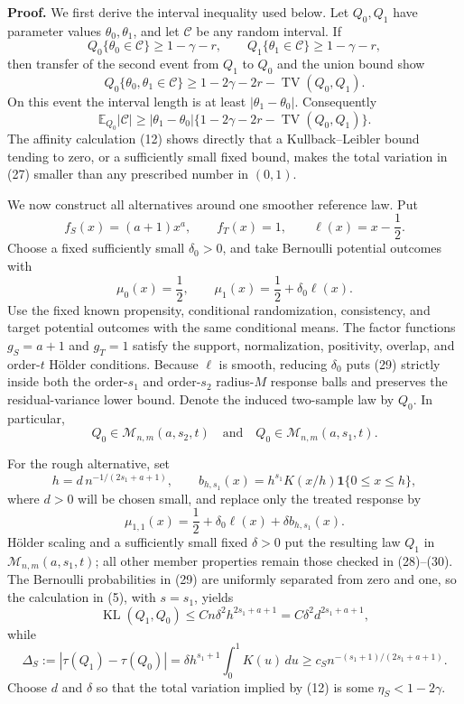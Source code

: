 \textbf{Proof.}
We first derive the interval inequality used below.  Let \(Q_0,Q_1\) have parameter values \(\theta_0,\theta_1\), and let \(\mathcal C\) be any random interval.  If
\[
Q_0\{\theta_0\in\mathcal C\}\ge1-\gamma-r,
\qquad
Q_1\{\theta_1\in\mathcal C\}\ge1-\gamma-r,
\tag{25}
\]
then transfer of the second event from \(Q_1\) to \(Q_0\) and the union bound show
\[
Q_0\{\theta_0,\theta_1\in\mathcal C\}
\ge1-2\gamma-2r-\operatorname{TV}(Q_0,Q_1).
\tag{26}
\]
On this event the interval length is at least \(|\theta_1-\theta_0|\).  Consequently
\[
\mathbb E_{Q_0}|\mathcal C|
\ge |\theta_1-\theta_0|
 \{1-2\gamma-2r-\operatorname{TV}(Q_0,Q_1)\}.
\tag{27}
\]
The affinity calculation (12) shows directly that a Kullback--Leibler bound tending to zero, or a sufficiently small fixed bound, makes the total variation in (27) smaller than any prescribed number in \((0,1)\).

We now construct all alternatives around one smoother reference law.  Put
\[
f_S(x)=(a+1)x^a,
\qquad
f_T(x)=1,
\qquad
\ell(x)=x-\frac12.
\tag{28}
\]
Choose a fixed sufficiently small \(\delta_0>0\), and take Bernoulli potential outcomes with
\[
\mu_0(x)=\frac12,
\qquad
\mu_1(x)=\frac12+\delta_0\ell(x).
\tag{29}
\]
Use the fixed known propensity, conditional randomization, consistency, and target potential outcomes with the same conditional means.  The factor functions \(g_S=a+1\) and \(g_T=1\) satisfy the support, normalization, positivity, overlap, and order-\(t\) Hölder conditions.  Because \(\ell\) is smooth, reducing \(\delta_0\) puts (29) strictly inside both the order-\(s_1\) and order-\(s_2\) radius-\(M\) response balls and preserves the residual-variance lower bound.  Denote the induced two-sample law by \(Q_0\).  In particular,
\[
Q_0\in\mathcal M_{n,m}(a,s_2,t)
\quad\text{and}\quad
Q_0\in\mathcal M_{n,m}(a,s_1,t).
\tag{30}
\]

For the rough alternative, set
\[
h=d\,n^{-1/(2s_1+a+1)},
\qquad
b_{h,s_1}(x)=h^{s_1}K(x/h)\mathbf 1\{0\le x\le h\},
\tag{31}
\]
where \(d>0\) will be chosen small, and replace only the treated response by
\[
\mu_{1,1}(x)=\frac12+\delta_0\ell(x)+\delta b_{h,s_1}(x).
\tag{32}
\]
Hölder scaling and a sufficiently small fixed \(\delta>0\) put the resulting law \(Q_1\) in \(\mathcal M_{n,m}(a,s_1,t)\); all other member properties remain those checked in (28)--(30).  The Bernoulli probabilities in (29) are uniformly separated from zero and one, so the calculation in (5), with \(s=s_1\), yields
\[
\operatorname{KL}(Q_1,Q_0)
\le Cn\delta^2h^{2s_1+a+1}
=C\delta^2d^{2s_1+a+1},
\tag{33}
\]
while
\[
\Delta_S:=|\tau(Q_1)-\tau(Q_0)|
=\delta h^{s_1+1}\int_0^1K(u)\,du
\ge c_Sn^{-(s_1+1)/(2s_1+a+1)}.
\tag{34}
\]
Choose \(d\) and \(\delta\) so that the total variation implied by (12) is some \(\eta_S<1-2\gamma\).

